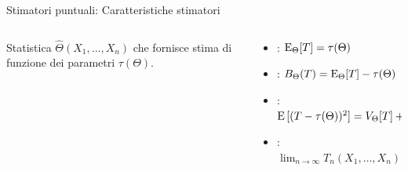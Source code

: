 \documentclass[asd-beamer.tex]{subfiles}
\begin{document}
\begin{frame}{Stimatori puntuali: Caratteristiche stimatori}
	\begin{columns}[T]
		\begin{column}{0.4\textwidth}
			Statistica $\hat{\Theta}(X_1,\ldots,X_n)$ che fornisce stima di funzione dei parametri $\tau(\Theta)$.
		\end{column}
		\begin{column}{0.6\textwidth}
			\begin{itemize}
				\item {}: $\operatorname{E}_{\Theta}[T]=\tau(\Theta)$
				\item {}: $B_{\Theta}(T)=\operatorname{E}_{\Theta}[T]-\tau(\Theta)$
				\item {}: $\operatorname{E}{[(T-\tau(\Theta))^2]}=V_{\Theta}[T]+(\operatorname{E}{[T]}-\tau(\Theta))^2$
				\item {}: $\lim_{n\to\infty}T_n(X_1,\ldots,X_n)\overset{P}{=}\tau(\Theta)$
			\end{itemize}
		\end{column}
	\end{columns}
\end{frame}
\end{document}
